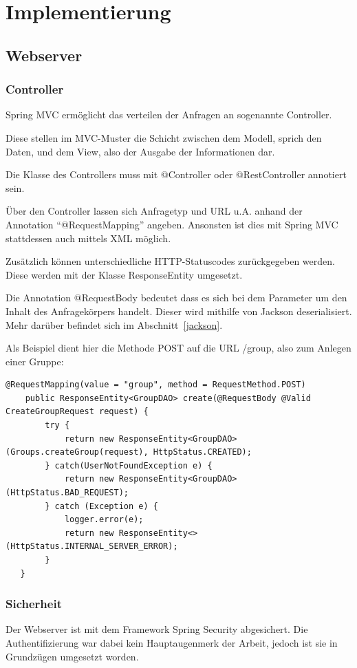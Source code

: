 \section{Implementierung}\label{kapitel6}
\subsection{Webserver}
\subsubsection{Controller}
Spring MVC ermöglicht das verteilen der Anfragen an sogenannte Controller.

Diese stellen im MVC-Muster die Schicht zwischen dem Modell, sprich den Daten, und dem View, also der Ausgabe der Informationen dar.

Die Klasse des Controllers muss mit @Controller oder @RestController annotiert sein.

Über den Controller lassen sich Anfragetyp und URL u.A. anhand der Annotation ``@RequestMapping'' angeben. Ansonsten ist dies mit Spring MVC stattdessen auch mittels XML möglich.

Zusätzlich können unterschiedliche HTTP-Statuscodes zurückgegeben werden. Diese werden mit der Klasse ResponseEntity umgesetzt.

Die Annotation @RequestBody bedeutet dass es sich bei dem Parameter um den Inhalt des Anfragekörpers handelt. Dieser wird mithilfe von Jackson deserialisiert. Mehr darüber befindet sich im Abschnitt~\ref{jackson}.

Als Beispiel dient hier die Methode POST auf die URL /group, also zum Anlegen einer Gruppe:
\lstset{language=java}
\begin{lstlisting}[frame=htrbl, caption={Controller zum Erstellen einer Gruppe}, breaklines=true]
@RequestMapping(value = "group", method = RequestMethod.POST)
    public ResponseEntity<GroupDAO> create(@RequestBody @Valid CreateGroupRequest request) {
        try {
            return new ResponseEntity<GroupDAO>(Groups.createGroup(request), HttpStatus.CREATED);
        } catch(UserNotFoundException e) {
            return new ResponseEntity<GroupDAO>(HttpStatus.BAD_REQUEST);
        } catch (Exception e) {
            logger.error(e);
            return new ResponseEntity<>(HttpStatus.INTERNAL_SERVER_ERROR);
        }
   }
\end{lstlisting}
\subsubsection{Sicherheit}
Der Webserver ist mit dem Framework Spring Security abgesichert. Die Authentifizierung war dabei kein Hauptaugenmerk der Arbeit, jedoch ist sie in Grundzügen umgesetzt worden. 

